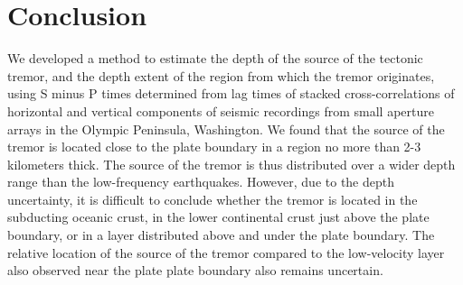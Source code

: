 \documentclass[draft]{agujournal2019}
\begin{document}
\section{Conclusion}

We developed a method to estimate the depth of the source of the tectonic tremor, and the depth extent of the region from which the tremor originates, using S minus P times determined from lag times of stacked cross-correlations of horizontal and vertical components of seismic recordings from small aperture arrays in the Olympic Peninsula, Washington. We found that the source of the tremor is located close to the plate boundary in a region no more than 2-3 kilometers thick. The source of the tremor is thus distributed over a wider depth range than the low-frequency earthquakes. However, due to the depth uncertainty, it is difficult to conclude whether the tremor is located in the subducting oceanic crust, in the lower continental crust just above the plate boundary, or in a layer distributed above and under the plate boundary. The relative location of the source of the tremor compared to the low-velocity layer also observed near the plate plate boundary also remains uncertain.





%
%
%
%
%
%
%
%
%
%
\end{document}
